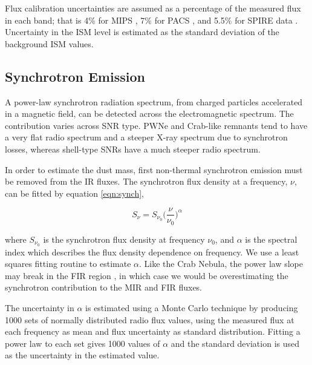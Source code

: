 \documentclass[fleqn,usenatbib]{mnras}
\begin{document}
{Flux calibration uncertainties are assumed as a percentage of the measured flux in each band; that is 4\% for MIPS \citep{Engelbracht2007}, 7\% for PACS \citep{Balog2014}, and 5.5\% for SPIRE data \citep{Bendo2013}. Uncertainty in the ISM level is estimated as the standard deviation of the background ISM values.



\subsection{Synchrotron Emission} \label{SynchrotronEmission}
A power-law synchrotron radiation spectrum, from charged particles accelerated in a magnetic field, can be detected across the electromagnetic spectrum. The contribution varies across SNR type. PWNe and Crab-like remnants tend to have a very flat radio spectrum and a steeper X-ray spectrum due to synchrotron losses, whereas shell-type SNRs have a much steeper radio spectrum.

In order to estimate the dust mass, first non-thermal synchrotron emission must be removed from the IR fluxes. The synchrotron flux density at a frequency, $\nu$, can be fitted by equation \ref{eqn:synch},

\begin{equation} \label{eqn:synch}
	S_\nu = S_{\nu_0}\bigg(\frac{\nu}{\nu_0}\bigg)^\alpha
\end{equation}

where $S_{\nu_0}$ is the synchrotron flux density at frequency $\nu_0$, and $\alpha$ is the spectral index which describes the flux density dependence on frequency. We use a least squares fitting routine to estimate $\alpha$. Like the Crab Nebula, the power law slope may break in the FIR region \citep[e.g.][]{Arendt2011, Gomez2012b}, in which case we would be overestimating the synchrotron contribution to the MIR and FIR fluxes.

The uncertainty in $\alpha$ is estimated using a Monte Carlo technique by producing 1000 sets of normally distributed radio flux values, using the measured flux at each frequency as mean and flux uncertainty as standard distribution. Fitting a power law to each set gives 1000 values of $\alpha$ and the standard deviation is used as the uncertainty in the estimated value.

}
\end{document}
